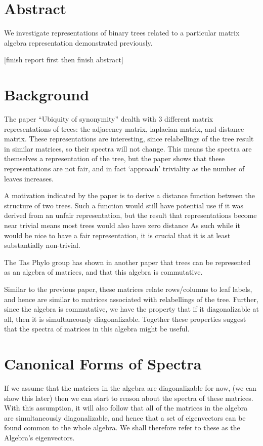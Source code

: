 \documentclass{report}
\begin{document}
\section{Abstract}

We investigate representations of binary trees related to a particular matrix
algebra representation demonstrated previously.

[finish report first then finish abstract]

\section{Background}

The paper ``Ubiquity of synonymity'' dealth with 3 different matrix
representations of trees: the adjacency matrix, laplacian matrix, and distance
matrix.
These representations are interesting, since relabellings of the tree result
in similar matrices, so their spectra will not change.
This means the spectra are themselves a representation of the tree, but the
paper shows that these representations are not fair, and in fact `approach'
triviality as the number of leaves increases.

A motivation indicated by the paper is to derive a distance function between
the structure of two trees.
Such a function would still have potential use if it was derived from an unfair
representation, but the result that representations become near trivial means
most trees would also have zero distance
As such while it would be nice to have a fair representation, it is crucial
that it is at least substantially non-trivial.

The Tas Phylo group has shown in another paper that trees can be represented as
an algebra of matrices, and that this algebra is commutative.

Similar to the previous paper, these matrices relate rows/columns to leaf
labels, and hence are similar to matrices associated with relabellings of the
tree.
Further, since the algebra is commutative, we have the property that if it
diagonalizable at all, then it is simultaneously diagonalizable.
Together these properties suggest that the spectra of matrices in this algebra
might be useful.

\section{Canonical Forms of Spectra}

If we assume that the matrices in the algebra are diagonalizable for now, (we
can show this later) then we can start to reason about the spectra of these
matrices.
With this assumption, it will also follow that all of the matrices in the
algebra are simultaneously diagonalizable, and hence that a set of eigenvectors
can be found common to the whole algebra.
We shall therefore refer to these as the Algebra's eigenvectors.
\end{document}

